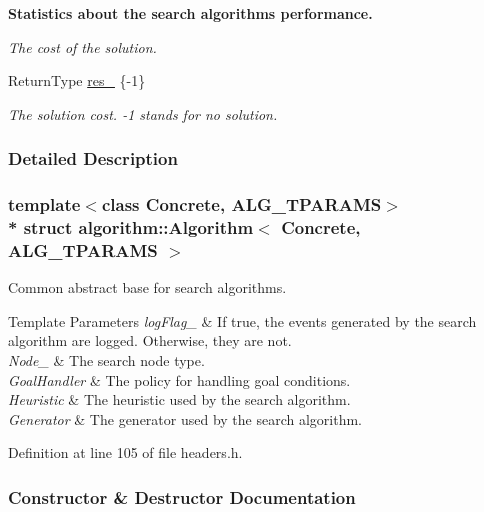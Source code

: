 \begin{Indent}{\bf Statistics about the search algorithm\textquotesingle{}s performance.}
\begin{DoxyCompactItemize}
\begin{DoxyCompactList}\small\item\em The cost of the solution. \end{DoxyCompactList}\item 
Return\+Type \hyperlink{structalgorithm_1_1Algorithm_a856b28c6c118d0ea62970bc889d400fc}{res\+\_\+} \{-\/1\}\hypertarget{structalgorithm_1_1Algorithm_a856b28c6c118d0ea62970bc889d400fc}{}\label{structalgorithm_1_1Algorithm_a856b28c6c118d0ea62970bc889d400fc}

\begin{DoxyCompactList}\small\item\em The solution cost. -\/1 stands for no solution. \end{DoxyCompactList}\end{DoxyCompactItemize}
\end{Indent}


\subsubsection{Detailed Description}
\subsubsection*{template$<$class Concrete, A\+L\+G\+\_\+\+T\+P\+A\+R\+A\+MS$>$\\*
struct algorithm\+::\+Algorithm$<$ Concrete, A\+L\+G\+\_\+\+T\+P\+A\+R\+A\+M\+S $>$}

Common abstract base for search algorithms. 


\begin{DoxyTemplParams}{Template Parameters}
{\em log\+Flag\+\_\+} & If {\ttfamily true}, the events generated by the search algorithm are logged. Otherwise, they are not. \\
\hline
{\em Node\+\_\+} & The search node type. \\
\hline
{\em Goal\+Handler} & The policy for handling goal conditions. \\
\hline
{\em Heuristic} & The heuristic used by the search algorithm. \\
\hline
{\em Generator} & The generator used by the search algorithm. \\
\hline
\end{DoxyTemplParams}


Definition at line 105 of file headers.\+h.



\subsubsection{Constructor \& Destructor Documentation}
